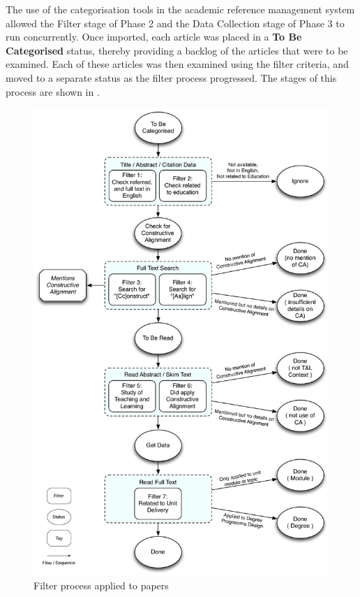 The use of the categorisation tools in the academic reference management system allowed the Filter stage of Phase 2 and the Data Collection stage of Phase 3 to run concurrently. Once imported, each article was placed in a \textbf{To Be Categorised} status, thereby providing a backlog of the articles that were to be examined. Each of these articles was then examined using the filter criteria, and moved to a separate status as the filter process progressed. The stages of this process are shown in .

\begin{figure}[tbph]
	\centering
	\includegraphics[width=\textwidth]{FilterProcess}
	\caption{Filter process applied to papers}
	\label{fig:filter_proc}
\end{figure}

